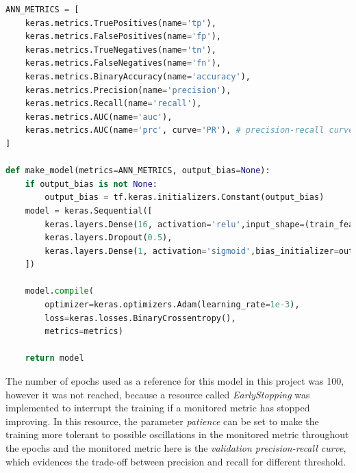 \documentclass{article}
\begin{document}
\begin{lstlisting}[language=Python]
ANN_METRICS = [
    keras.metrics.TruePositives(name='tp'),
    keras.metrics.FalsePositives(name='fp'),
    keras.metrics.TrueNegatives(name='tn'),
    keras.metrics.FalseNegatives(name='fn'), 
    keras.metrics.BinaryAccuracy(name='accuracy'),
    keras.metrics.Precision(name='precision'),
    keras.metrics.Recall(name='recall'),
    keras.metrics.AUC(name='auc'),
    keras.metrics.AUC(name='prc', curve='PR'), # precision-recall curve
]

def make_model(metrics=ANN_METRICS, output_bias=None):
    if output_bias is not None:
        output_bias = tf.keras.initializers.Constant(output_bias)
    model = keras.Sequential([
        keras.layers.Dense(16, activation='relu',input_shape=(train_features.shape[-1],)),
        keras.layers.Dropout(0.5),
        keras.layers.Dense(1, activation='sigmoid',bias_initializer=output_bias),
    ])

    model.compile(
        optimizer=keras.optimizers.Adam(learning_rate=1e-3),
        loss=keras.losses.BinaryCrossentropy(),
        metrics=metrics)

    return model
\end{lstlisting}

The number of epochs used as a reference for this model in this project was 100, however it was not reached, because a resource called \emph{EarlyStopping} was implemented to interrupt the training if a monitored metric has stopped improving. In this resource, the parameter \emph{patience} can be set to make the training more tolerant to possible oscillations in the monitored metric throughout the epochs and the monitored metric here is the \emph{validation precision-recall curve}, which evidences the trade-off between precision and recall for different threshold.
\end{document}
